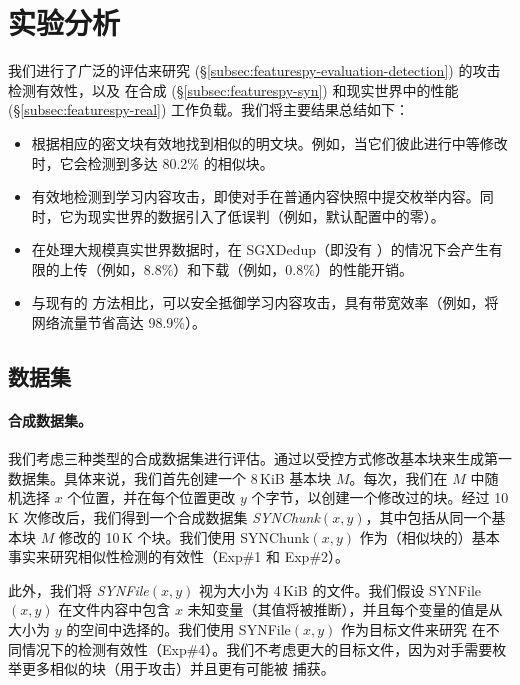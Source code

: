 \section{实验分析}
\label{sec:featurespy-evaluation}


我们进行了广泛的评估来研究 \sysnameF (\S\ref{subsec:featurespy-evaluation-detection}) 的攻击检测有效性，以及 \prototype 在合成 (\S\ref{subsec:featurespy-syn}) 和现实世界中的性能(\S\ref{subsec:featurespy-real}) 工作负载。我们将主要结果总结如下：

\begin{itemize}[leftmargin=*]
\item \sysnameF 根据相应的密文块有效地找到相似的明文块。例如，当它们彼此进行中等修改时，它会检测到多达 80.2\% 的相似块。
\item \sysnameF 有效地检测到学习内容攻击，即使对手在普通内容快照中提交枚举内容。同时，它为现实世界的数据引入了低误判（例如，默认配置中的零）。
\item \prototype 在处理大规模真实世界数据时，在 SGXDedup（即没有 \sysnameF）的情况下会产生有限的上传（例如，8.8\%）和下载（例如，0.8\%）的性能开销。
\item 与现有的 \cite{harnik10, li15} 方法相比，可以安全抵御学习内容攻击，\prototype 具有带宽效率（例如，将网络流量节省高达 98.9\%）。
\end{itemize}


\subsection{数据集}
\label{subsec:featurespy-datasets}

\paragraph*{合成数据集。}

我们考虑三种类型的合成数据集进行评估。通过以受控方式修改基本块来生成第一数据集。具体来说，我们首先创建一个 8\,KiB 基本块 $M$。每次，我们在 $M$ 中随机选择 $x$ 个位置，并在每个位置更改 $y$ 个字节，以创建一个修改过的块。经过 10\,K 次修改后，我们得到一个合成数据集 {\em SYNChunk}$(x, y)$，其中包括从同一个基本块 $M$ 修改的 10\,K 个块。我们使用 SYNChunk$(x, y)$ 作为（相似块的）基本事实来研究相似性检测的有效性（Exp\#1 和 Exp\#2）。

此外，我们将 {\em SYNFile}$(x, y)$ 视为大小为 4\,KiB 的文件。我们假设 SYNFile$(x, y)$ 在文件内容中包含 $x$ 未知变量（其值将被推断），并且每个变量的值是从大小为 $y$ 的空间中选择的。我们使用 SYNFile$(x, y)$ 作为目标文件来研究 \sysnameF 在不同情况下的检测有效性（Exp\#4）。我们不考虑更大的目标文件，因为对手需要枚举更多相似的块（用于攻击）并且更有可能被 \sysnameF 捕获。

